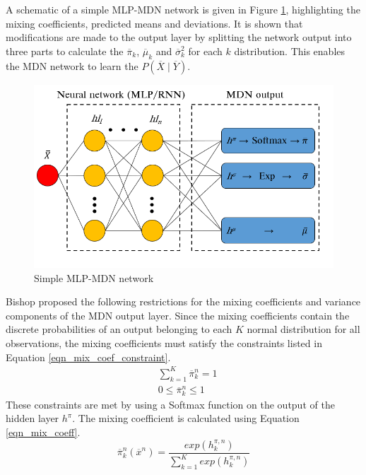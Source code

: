 \documentclass[a4paper,fleqn]{cas-dc}
\begin{document}
A schematic of a simple MLP-MDN network is given in Figure \ref{fig_mdn_schematic}, highlighting the mixing coefficients, predicted means and deviations. It is shown that modifications are made to the output layer by splitting the network output into three parts to calculate the $\overline{\pi}_k$, $\overline{\mu}_k$ and $\overline{\sigma}^2_k$ for each $k$ distribution. This enables the MDN network to learn the $P(\overline{X}\mid\overline{Y})$.\\

\begin{figure}[h!]
	\centering
		\includegraphics[scale=0.5]{MDN_SCHEMATIC}
	  \caption{Simple MLP-MDN network}\label{fig_mdn_schematic}
\end{figure}

Bishop \cite{bishop1994} proposed the following restrictions for the mixing coefficients and variance components of the MDN output layer. Since the mixing coefficients contain the discrete probabilities of an output belonging to each $K$ normal distribution for all observations, the mixing coefficients must satisfy the constraints listed in Equation \ref{eqn_mix_coef_constraint}.
\begin{equation}\label{eqn_mix_coef_constraint}
\begin{split}
&\sum_{k=1}^K\overline{\pi}_k^n=1\\
&0\leq\overline{\pi}_k^n\leq1
\end{split}
\end{equation}
These constraints are met by using a Softmax function on the output of the hidden layer $h^{\pi}$. The mixing coefficient is calculated using Equation \ref{eqn_mix_coeff}.
\begin{equation}\label{eqn_mix_coeff}
\overline{\pi}_k^n(\overline{x}^n)=\frac{exp(h_k^{\pi,n})}{\sum_{k=1}^Kexp(h_k^{\pi,n})}
\end{equation}
\end{document}
